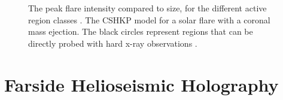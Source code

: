 \documentclass[11pt,a4paper,onecolumn]{report}
\begin{document}
\begin{figure}[t]%
  \centering
  \qquad
  \caption{ The peak flare intensity compared to
  size, for the different active region classes \citep{sammis_dependence_2000}.
   The CSHKP model for a solar flare with a coronal mass
  ejection. The black circles represent regions that can be directly probed with
  hard x-ray observations \citep{Christe2017}.}
\end{figure}







\section{Farside Helioseismic Holography}
\label{sec:FHSM}

\end{document}
